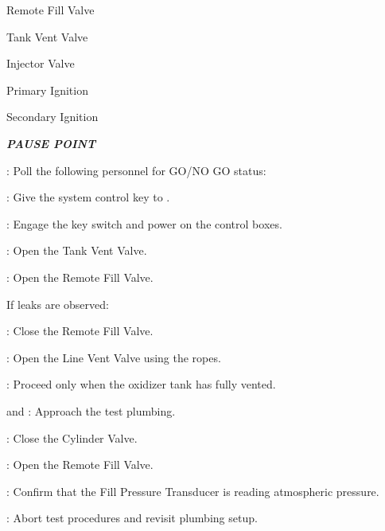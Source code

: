 \begin{checklist}
\begin{checklist}
        \item Remote Fill Valve
        \item Tank Vent Valve
        \item Injector Valve
        \item Primary Ignition
        \item Secondary Ignition
    \end{checklist}
    \item \textbf{\textit{PAUSE POINT}}
    \item \ops{}: Poll the following personnel for GO/NO GO status:
    \begin{checklist}
        \item \peri{}
        \item \perii{}
        \item \heat
        \item \daq{}
        \item \primary{}
        \item \secondary
    \end{checklist}
    \item \secondary: Give the system control key to \primary{}.
    \item \primary{}: Engage the key switch and power on the control boxes.
    \item \primary{}: Open the Tank Vent Valve.
    \item \primary{}: Open the Remote Fill Valve.
    \begin{checklist}[label=$\bullet$]
        \item If leaks are observed:
        \begin{checklist}
            \item \primary{}: Close the Remote Fill Valve.
            \item \primary{}: Open the Line Vent Valve using the ropes.
            \item \secondary: Proceed only when the oxidizer tank has fully vented.
            \item \primary{} and \secondary: Approach the test plumbing.
            \item \primary{}: Close the Cylinder Valve.
            \item \primary{}: Open the Remote Fill Valve.
            \item \daq{}: Confirm that the Fill Pressure Transducer is reading atmospheric pressure.
            \item \ops{}: Abort test procedures and revisit plumbing setup.

\end{checklist}
\end{checklist}
\end{checklist}
